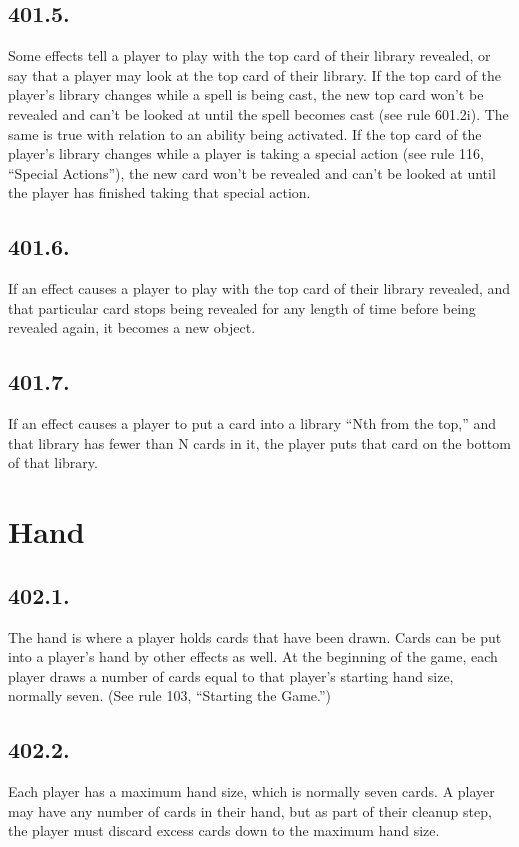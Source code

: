 \subsection*{401.5.}
Some effects tell a player to play with the top card of their library revealed, or say that a player may look at the top card of their library. If the top card of the player’s library changes while a spell is being cast, the new top card won’t be revealed and can’t be looked at until the spell becomes cast (see rule 601.2i). The same is true with relation to an ability being activated. If the top card of the player’s library changes while a player is taking a special action (see rule 116, “Special Actions”), the new card won’t be revealed and can’t be looked at until the player has finished taking that special action.

\subsection*{401.6.}
If an effect causes a player to play with the top card of their library revealed, and that particular card stops being revealed for any length of time before being revealed again, it becomes a new object.

\subsection*{401.7.}
If an effect causes a player to put a card into a library “Nth from the top,” and that library has fewer than N cards in it, the player puts that card on the bottom of that library.

\section{Hand}
\subsection*{402.1.}
The hand is where a player holds cards that have been drawn. Cards can be put into a player’s hand by other effects as well. At the beginning of the game, each player draws a number of cards equal to that player’s starting hand size, normally seven. (See rule 103, “Starting the Game.”)

\subsection*{402.2.}
Each player has a maximum hand size, which is normally seven cards. A player may have any number of cards in their hand, but as part of their cleanup step, the player must discard excess cards down to the maximum hand size.


